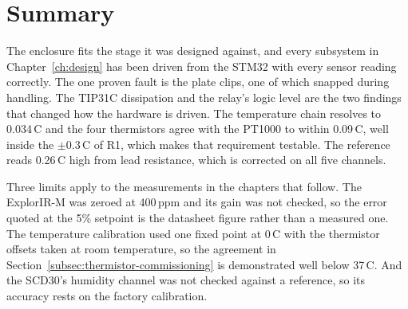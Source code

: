 \section{Summary}
\label{sec:commissioning-summary}

The enclosure fits the stage it was designed against, and every subsystem in Chapter~\ref{ch:design} has been driven from the STM32 with every sensor reading correctly. The one proven fault is the plate clips, one of which snapped during handling. The TIP31C dissipation and the relay's logic level are the two findings that changed how the hardware is driven. The temperature chain resolves to 0.034\,\textdegree{}C and the four thermistors agree with the PT1000 to within 0.09\,\textdegree{}C, well inside the $\pm$0.3\,\textdegree{}C of R1, which makes that requirement testable. The reference reads 0.26\,\textdegree{}C high from lead resistance, which is corrected on all five channels.

Three limits apply to the measurements in the chapters that follow. The ExplorIR-M was zeroed at 400\,ppm and its gain was not checked, so the error quoted at the 5\% setpoint is the datasheet figure rather than a measured one. The temperature calibration used one fixed point at 0\,\textdegree{}C with the thermistor offsets taken at room temperature, so the agreement in Section~\ref{subsec:thermistor-commissioning} is demonstrated well below 37\,\textdegree{}C. And the SCD30's humidity channel was not checked against a reference, so its accuracy rests on the factory calibration.

